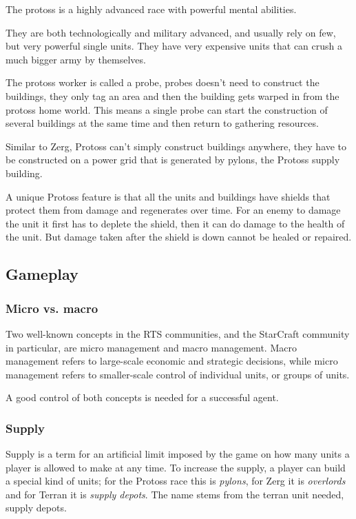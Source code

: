 The protoss is a highly advanced race with powerful mental abilities.

They are both technologically and military advanced, and usually rely on few, but very powerful single units. They have very expensive units that can crush a much bigger army by themselves.

The protoss worker is called a probe, probes doesn't need to construct the buildings, they only tag an area and then the building gets warped in from the protoss home world. This means a single probe can start the construction of several buildings at the same time and then return to gathering resources.

Similar to Zerg, Protoss can't simply construct buildings anywhere, they have to be constructed on a power grid that is generated by pylons, the Protoss supply building.

A unique Protoss feature is that all the units and buildings have shields that protect them from damage and regenerates over time. For an enemy to damage the unit it first has to deplete the shield, then it can do damage to the health of the unit. But damage taken after the shield is down cannot be healed or repaired.

\subsection{Gameplay}
\subsubsection{Micro vs. macro}
Two well-known concepts in the RTS communities, and the StarCraft community in particular, are micro management and macro management. Macro management refers to large-scale economic and strategic decisions, while micro management refers to smaller-scale control of individual units, or groups of units.

A good control of both concepts is needed for a successful agent.

\subsubsection{Supply}
Supply is a term for an artificial limit imposed by the game on how many units a player is allowed to make at any time. To increase the supply, a player can build a special kind of units; for the Protoss race this is {\em pylons}, for Zerg it is {\em overlords} and for Terran it is {\em supply depots}. The name stems from the terran unit needed, supply depots.

